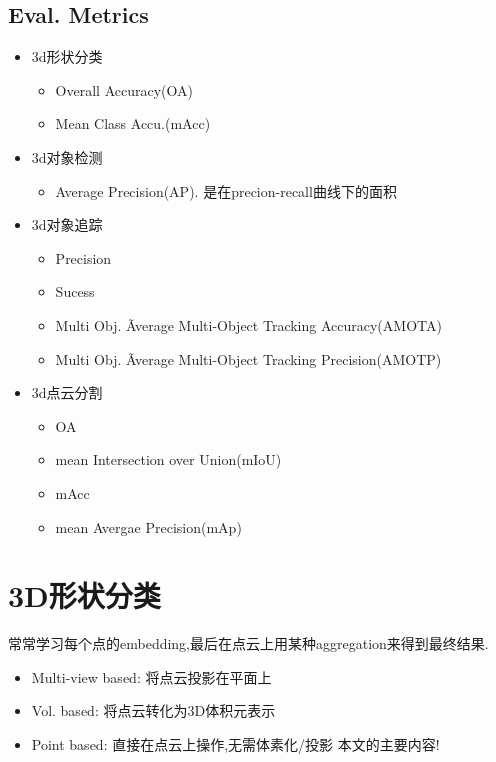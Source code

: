 \documentclass{article}
\begin{document}
\subsection{Eval. Metrics}
\begin{itemize}
    \item 3d形状分类
    \begin{itemize}
        \item Overall Accuracy(OA)
        \item Mean Class Accu.(mAcc)
    \end{itemize}
    \item 3d对象检测
    \begin{itemize}
        \item Average Precision(AP). 是在precion-recall曲线下的面积
    \end{itemize}
    \item 3d对象追踪
    \begin{itemize}
        \item Precision
        \item Sucess
        \item Multi Obj. \~ Average Multi-Object Tracking Accuracy(AMOTA)
        \item Multi Obj. \~ Average Multi-Object Tracking Precision(AMOTP)
    \end{itemize}
    \item 3d点云分割
    \begin{itemize}
        \item OA 
        \item mean Intersection over Union(mIoU)
        \item mAcc
        \item mean Avergae Precision(mAp)
    \end{itemize}
\end{itemize}

\section{3D形状分类}

常常学习每个点的embedding,最后在点云上用某种aggregation来得到最终结果.
\begin{itemize}
    \item Multi-view based: 将点云投影在平面上
    \item Vol. based: 将点云转化为3D体积元表示
    \item Point based: 直接在点云上操作,无需体素化/投影 \trarr 本文的主要内容!
\end{itemize}
\end{document}
